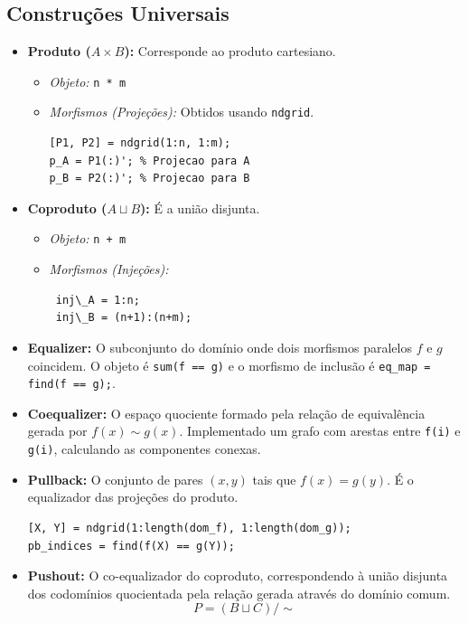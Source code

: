 \documentclass[11pt,a4paper]{article}
\begin{document}
\subsection{Construções Universais}
\begin{itemize}
    \item \textbf{Produto ($A \times B$):} Corresponde ao produto cartesiano.
    \begin{itemize}
        \item \textit{Objeto:} \texttt{n * m}
        \item \textit{Morfismos (Projeções):} Obtidos usando \texttt{ndgrid}.
\begin{lstlisting}
[P1, P2] = ndgrid(1:n, 1:m);
p_A = P1(:)'; % Projecao para A
p_B = P2(:)'; % Projecao para B
\end{lstlisting}
    \end{itemize}
    
    \item \textbf{Coproduto ($A \sqcup B$):} É a união disjunta.
    \begin{itemize}
        \item \textit{Objeto:} \texttt{n + m}
        \item \textit{Morfismos (Injeções):}
\begin{lstlisting}
 inj\_A = 1:n;
 inj\_B = (n+1):(n+m);
\end{lstlisting}
    \end{itemize}
    
    \item \textbf{Equalizer:} O subconjunto do domínio onde dois morfismos paralelos $f$ e $g$ coincidem. O objeto é \texttt{sum(f == g)} e o morfismo de inclusão é \texttt{eq\_map = find(f == g);}.
    
    \item \textbf{Coequalizer:} O espaço quociente formado pela relação de equivalência gerada por $f(x) \sim g(x)$. Implementado um grafo com arestas entre \texttt{f(i)} e \texttt{g(i)}, calculando as componentes conexas.
    
    \item \textbf{Pullback:} O conjunto de pares $(x, y)$ tais que $f(x) = g(y)$. É o equalizador das projeções do produto.
\begin{lstlisting}
[X, Y] = ndgrid(1:length(dom_f), 1:length(dom_g));
pb_indices = find(f(X) == g(Y));
\end{lstlisting}

    \item \textbf{Pushout:} O co-equalizador do coproduto, correspondendo à união disjunta dos codomínios quocientada pela relação gerada através do domínio comum.
\begin{equation}
P = (B \sqcup C) / {\sim}
\end{equation}
\end{itemize}
\newpage
\end{document}
